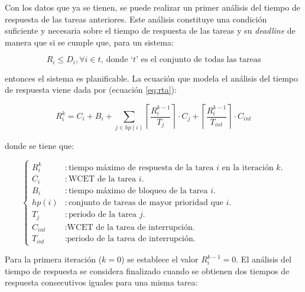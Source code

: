 Con los datos que ya se tienen, se puede realizar un primer análisis del tiempo
de respuesta de las tareas anteriores. Este análisis constituye una condición
suficiente y necesaria sobre el tiempo de respuesta de las tareas y su \textit{deadline}
de manera que si se cumple que, para un sistema:

\begin{equation*}
  R_i \le D_i, \forall i \in t,~\text{donde `$t$' es el conjunto de todas las tareas}
\end{equation*}

entonces el sistema es planificable. La ecuación que modela el análisis del tiempo
de respuesta viene dada por (ecuación \ref{eq:rta}):

\begin{equation}\label{eq:rta}
  R_i^k = C_i + B_i + \sum_{j \in hp\left(i\right)}  \left\lceil \frac{R_i^{k - 1}}{T_j} \right\rceil \cdot C_j + \left\lceil \frac{R_i^{k - 1}}{T_{int}} \right\rceil \cdot C_{int}
\end{equation}

donde se tiene que:

\begin{equation*}
  \left\{\begin{aligned}
    R_i^k            & : \text{tiempo máximo de respuesta de la tarea $i$ en la iteración $k$.} \\
    C_i              & : \text{WCET de la tarea $i$.}                                           \\
    B_i              & : \text{tiempo máximo de bloqueo de la tarea $i$.}                       \\
    hp\left(i\right) & : \text{conjunto de tareas de mayor prioridad que $i$.}                  \\
    T_j              & : \text{periodo de la tarea $j$.}                                        \\
    C_{int}          & : \text{WCET de la tarea de interrupción.}                               \\
    T_{int}          & : \text{periodo de la tarea de interrupción.}
  \end{aligned}\right.
\end{equation*}

Para la primera iteración ($k = 0$) se establece el valor $R_i^{k - 1} = 0$. El análisis
del tiempo de respuesta se considera finalizado cuando se obtienen dos tiempos de respuesta
consecutivos iguales para una misma tarea:

